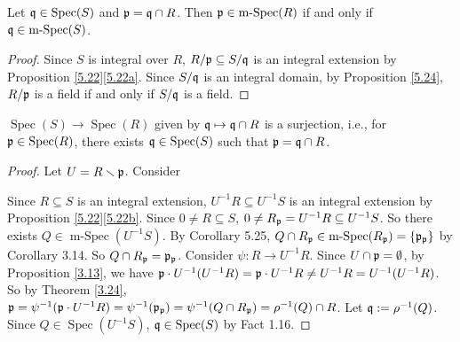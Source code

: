 \begin{corollary}\label{5.25}
    Let $\mathfrak{q} \in \operatorname{Spec}(S)$ and $\mathfrak{p} = \mathfrak{q} \cap R$. Then $\mathfrak{p} \in \operatorname{m-Spec}(R)$ if and only if $\mathfrak{q} \in \operatorname{m-Spec}(S)$. 
\end{corollary}

\begin{proof}
    Since $S$ is integral over $R$, $R/\mathfrak{p} \subseteq S/\mathfrak{q}$ is an integral extension by Proposition \ref{5.22}\ref{5.22a}. Since $S/\mathfrak{q}$ is an integral domain, by Proposition \ref{5.24}, $R/\mathfrak{p}$ is a field if and only if $S/\mathfrak{q}$ is a field.
\end{proof}

\begin{theorem}\label{5.26}
    $\operatorname{Spec}(S) \to \operatorname{Spec}(R)$ given by $\mathfrak{q} \mapsto \mathfrak{q} \cap R$ is a surjection, i.e., for $\mathfrak{p} \in \operatorname{Spec}(R)$, there exists $\mathfrak{q} \in \operatorname{Spec}(S)$ such that $\mathfrak{p} = \mathfrak{q} \cap R$.
\end{theorem}

\begin{proof}
    Let $U = R \smallsetminus \mathfrak{p}$. Consider
    \begin{center}
    \end{center}
    Since $R \subseteq S$ is an integral extension, $U^{-1}R \subseteq U^{-1}S$ is an integral extension by Proposition \ref{5.22}\ref{5.22b}. Since $0 \neq R \subseteq S$, $0 \neq R_{\mathfrak{p}} = U^{-1}R \subseteq U^{-1}S$. So there exists $Q \in \operatorname{m-Spec}(U^{-1}S)$. By Corollary 5.25, $Q \cap R_{\mathfrak{p}}\in \operatorname{m-Spec}(R_{\mathfrak{p}}) = \{\mathfrak{p}_{\mathfrak{p}}\}$ by Corollary 3.14. So $Q \cap R_{\mathfrak{p}} = \mathfrak{p}_{\mathfrak{p}}$. Consider $\psi: R \to U^{-1}R$. Since $U \cap \mathfrak{p} = \emptyset$, by Proposition \ref{3.13}, we have $\mathfrak{p} \cdot U^{-1}(U^{-1}R) = \mathfrak{p} \cdot U^{-1}R \neq U^{-1}R = U^{-1}(U^{-1}R)$. So by Theorem \ref{3.24}, $\mathfrak{p} = \psi^{-1}(\mathfrak{p} \cdot U^{-1}R) = \psi^{-1}(\mathfrak{p}_{\mathfrak{p}}) = \psi^{-1}(Q \cap R_{\mathfrak{p}}) = \rho^{-1}(Q) \cap R$. Let $\mathfrak{q} := \rho^{-1}(Q)$. Since $Q \in \operatorname{Spec}(U^{-1}S)$, $\mathfrak{q} \in \operatorname{Spec}(S)$ by Fact 1.16.
\end{proof}

